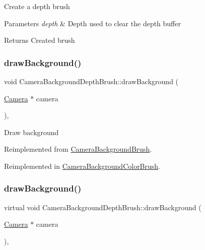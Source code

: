 Create a depth brush 
\begin{DoxyParams}{Parameters}
{\em depth} & Depth used to clear the depth buffer \\
\hline
\end{DoxyParams}
\begin{DoxyReturn}{Returns}
Created brush 
\end{DoxyReturn}
\mbox{\label{classCameraBackgroundDepthBrush_afe438cdd7dbcf77d6421ec50224579d1}} 
\subsubsection{\texorpdfstring{draw\+Background()}{drawBackground()}\hspace{0.1cm}{\footnotesize\ttfamily [1/2]}}
{\footnotesize\ttfamily void Camera\+Background\+Depth\+Brush\+::draw\+Background (\begin{DoxyParamCaption}\item[{\hyperlink{classCamera}{Camera} $\ast$}]{camera }\end{DoxyParamCaption})\hspace{0.3cm}{\ttfamily [override]}, {\ttfamily [virtual]}}

Draw background 

Reimplemented from \hyperlink{classCameraBackgroundBrush_aa079883211a8ebabf567a1967b325087}{Camera\+Background\+Brush}.



Reimplemented in \hyperlink{classCameraBackgroundColorBrush_aa07e5c7ea9d5c233c51920bf75d1381b}{Camera\+Background\+Color\+Brush}.

\mbox{\label{classCameraBackgroundDepthBrush_aa87e44c303dcf8e2560ee56d5c8fee58}} 
\subsubsection{\texorpdfstring{draw\+Background()}{drawBackground()}\hspace{0.1cm}{\footnotesize\ttfamily [2/2]}}
{\footnotesize\ttfamily virtual void Camera\+Background\+Depth\+Brush\+::draw\+Background (\begin{DoxyParamCaption}\item[{\hyperlink{classCamera}{Camera} $\ast$}]{camera }\end{DoxyParamCaption})\hspace{0.3cm}{\ttfamily [override]}, {\ttfamily [virtual]}}

